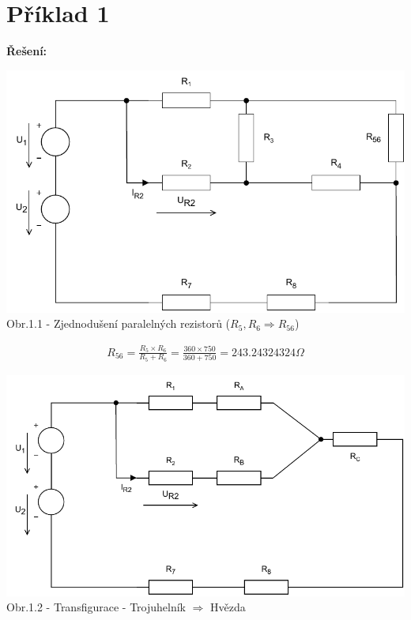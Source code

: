 \section{Příklad 1}

\large{\textbf{Řešení:}}

\begin{center}
\includegraphics[scale=0.8,keepaspectratio]{fig/solutions/01-sol/01-step1.pdf} \\
Obr.1.1 - Zjednodušení paralelných rezistorů
($R_5, R_6 \Rightarrow R_{56}$)
\end{center}

\begin{gather*}
R_{56} = \frac{R_5 \times R_6}{R_5 + R_6} = \frac{360 \times 750}{360 + 750} = 243.24324324 \Omega
\end{gather*}

\newpage

\begin{center}
\includegraphics[scale=0.8,keepaspectratio]{fig/solutions/01-sol/01-step2.pdf} \\
Obr.1.2 - Transfigurace - Trojuhelník $\Rightarrow$ Hvězda
\end{center}


